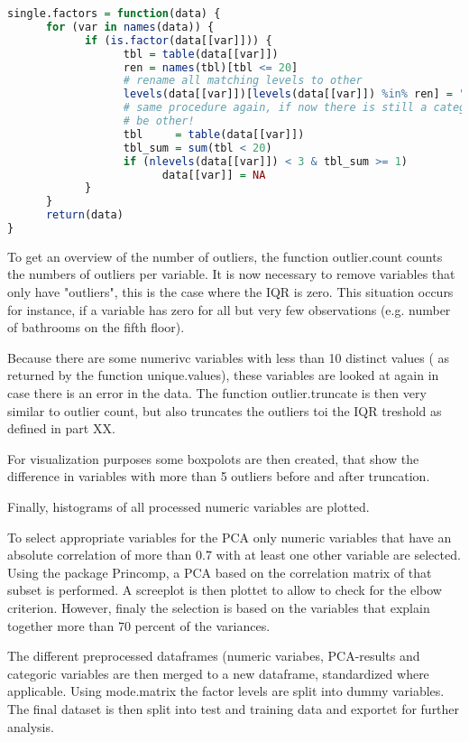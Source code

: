 \begin{lstlisting}[language=R]
single.factors = function(data) {
      for (var in names(data)) {
            if (is.factor(data[[var]])) {
                  tbl = table(data[[var]])
                  ren = names(tbl)[tbl <= 20]
                  # rename all matching levels to other
                  levels(data[[var]])[levels(data[[var]]) %in% ren] = "Other"
                  # same procedure again, if now there is still a category with less than 20 it can only
                  # be other!
                  tbl     = table(data[[var]])
                  tbl_sum = sum(tbl < 20)
                  if (nlevels(data[[var]]) < 3 & tbl_sum >= 1) 
                        data[[var]] = NA
            }
      }
      return(data)
}
\end{lstlisting}

 

To get an overview of the number of outliers, the function outlier.count  counts the numbers of outliers per variable.
It is now necessary to remove variables that only have "outliers", this is the case where the IQR is zero. This situation occurs for instance, if a variable has zero for all but very few observations (e.g. number of bathrooms on the fifth floor). 

Because there are some numerivc variables with less than 10 distinct values ( as returned by the function unique.values), these variables are looked at again in case there is an error in the data. 
The function outlier.truncate is then very similar to outlier count, but also truncates the outliers toi the IQR treshold as defined in part XX. 

For visualization purposes some boxpolots are then created, that show the difference in variables with more than 5 outliers before and after truncation. 

Finally, histograms of all processed numeric variables are plotted. 


To select appropriate variables for the PCA only numeric variables that have an absolute correlation of more than 0.7 with at least one other variable are selected.  Using the package Princomp, a PCA based on the correlation matrix of that subset is performed. 
A screeplot is then plottet to allow to check for the elbow criterion. 
However, finaly the selection is based on the variables that explain together more than 70 percent of the variances. 


The different preprocessed dataframes (numeric variabes, PCA-results and categoric variables are then merged to a new dataframe, standardized where applicable. Using mode.matrix the factor levels are split into dummy variables. The final dataset is then split into test and training data and exportet for further analysis. 
